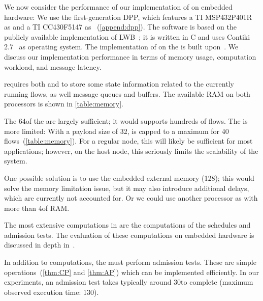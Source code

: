 We now consider the performance of our implementation of \DRP on embedded hardware: We use the first-generation DPP, which features a TI MSP432P401R as \AP and a TI CC430F5147 as \CP~(\cref{append:dpp}).
The software is based on the publicly available implementation of LWB~\cite{Code_LWB}; it is written in C and uses Contiki 2.7~\cite{contiki} as operating system.
The implementation of \blink on the \AP is built upon~\cite{acevedo2016Realtime}.
%
We discuss our implementation performance in terms of memory usage, computation workload, and message latency.

\DRP requires both \AP and \CP to store some state information related to the currently running flows, as well message queues and buffers. The available RAM on both processors is shown in \cref{table:memory}.

The 64\kB of the \AP are largely sufficient; it would supports hundreds of flows. The \CP is more limited: With a payload size of 32\bytes, \CP is capped to a maximum for 40 flows~(\cref{table:memory}). For a regular node, this will likely be sufficient for most applications; however, on the host node, this seriously limits the scalability of the system.

One possible solution is to use the embedded external memory (128\kB); this would solve the memory limitation issue, but it may also introduce additional delays, which are currently not accounted for. Or we could use another processor as \CP with more than 4\kB of RAM.

\begin{table}
	\centering
	\caption{Memory available and required for our implementation of \DRP.
	}
	\label{table:memory}
	{\smaller}
\end{table}

\pagebreak
{}
The most extensive computations in \DRP are the computations of the \blink schedules and admission tests. The evaluation of these computations on embedded hardware is discussed in depth in~\cite{zimmerling2017Blink}.

In addition to \blink computations, the \APs must perform \DRP admission tests. These are simple operations~(\cref{thm:CP} and \ref{thm:AP}) which can be implemented efficiently. In our experiments, an admission test takes typically around 30\ms to complete (maximum observed execution time: 130\ms).


